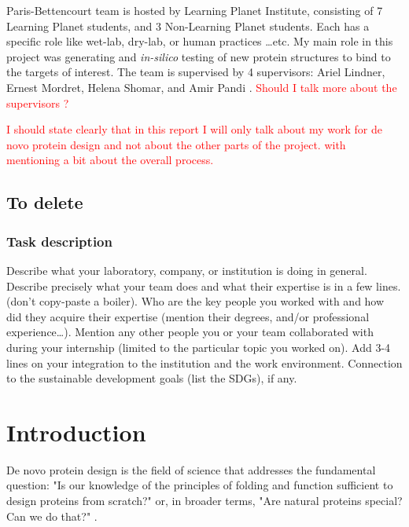 \documentclass[11pt,a4paper]{article}
\begin{document}
Paris-Bettencourt team is hosted by Learning Planet Institute,
consisting of 7 Learning Planet students, and 3 Non-Learning Planet students.
Each has a specific role like wet-lab, dry-lab, or human practices \ldots etc. 
My main role in this project was generating and \emph{in-silico} testing of new protein structures to bind to the targets of interest.
The team is supervised by 4 supervisors: Ariel Lindner, Ernest Mordret, Helena 
Shomar, and Amir Pandi \cite{paris_bettencourt_team}.
\textcolor{red}{Should I talk more about the supervisors ?}

\textcolor{red}{I should state clearly that in this report I will only talk about my work for de novo protein design and not about the other parts of the project. with mentioning a bit about the overall process.}


\subsection{To delete}

\subsubsection{Task description}

Describe what your laboratory, company, or institution is doing in general. 
Describe precisely what your team does and what their expertise is in a few lines. (don't copy-paste a boiler).
Who are the key people you worked with and how did they acquire their expertise (mention their degrees, and/or 
professional experience…). Mention any other people you or your team collaborated with during your internship (limited to the particular topic you worked on). 
Add 3-4 lines on your integration to the institution and the work environment.
Connection to the sustainable development goals (list the SDGs), if any.



\section{Introduction}

De novo protein design is the field of science that addresses the 
fundamental question: "Is our knowledge of the principles of folding 
and function sufficient to design proteins from scratch?" 
\cite{korendovych2020novo} or, in broader terms, "Are natural proteins 
special? Can we do that?" \cite{hecht2018natural}.
\end{document}
